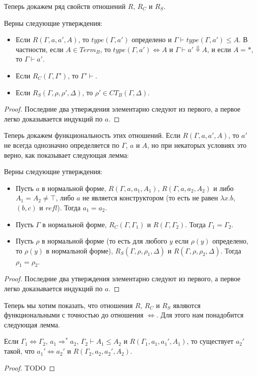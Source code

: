 \documentclass{amsart}
\theoremstyle{definition}
\theoremstyle{remark}
\newcommand{\red}{\Rightarrow}
\newcommand{\deq}{\Leftrightarrow}
\numberwithin{figure}{section}
\begin{document}
Теперь докажем ряд свойств отношений $R$, $R_C$ и $R_S$.
\begin{lem}
Верны следующие утверждения:
\begin{itemize}
\item Если $R(\Gamma, a, a', A)$, то $type(\Gamma, a')$ определено и $\Gamma \vdash type(\Gamma, a') \leq A$.
    В частности, если $A \in Term_B$, то $type(\Gamma, a') \deq A$ и $\Gamma \vdash a' \Downarrow A$,
    и если $A = *$, то $\Gamma \vdash a'$.
\item Если $R_C(\Gamma, \Gamma')$, то $\Gamma' \vdash$.
\item Если $R_S(\Gamma, \rho, \rho', \Delta)$, то $\rho' \in CT_B(\Gamma, \Delta)$.
\end{itemize}
\end{lem}
\begin{proof}
Последние два утверждения элементарно следуют из первого, а первое легко доказывается индукций по $a$.
\end{proof}

Теперь докажем функциональность этих отношений.
Если $R(\Gamma, a, a', A)$, то $a'$ не всегда однозначно определяется по $\Gamma$, $a$ и $A$, но при некаторых условиях это верно, как показывает следующая лемма:
\begin{lem}
Верны следующие утверждения:
\begin{itemize}
\item Пусть $a$ в нормальной форме, $R(\Gamma, a, a_1, A_1)$, $R(\Gamma, a, a_2, A_2)$ и либо $A_1 = A_2 \neq \top$, либо $a$ не является конструктором (то есть не равен $\lambda x. b$, $(b, c)$ и $refl$). Тогда $a_1 = a_2$.
\item Пусть $\Gamma$ в нормальной форме, $R_C(\Gamma, \Gamma_1)$ и $R(\Gamma, \Gamma_2)$. Тогда $\Gamma_1 = \Gamma_2$.
\item Пусть $\rho$ в нормальной форме (то есть для любого $y$ если $\rho(y)$ определено, то $\rho(y)$ в нормальной форме), $R_S(\Gamma, \rho, \rho_1, \Delta)$ и $R(\Gamma, \rho, \rho_2, \Delta)$. Тогда $\rho_1 = \rho_2$.
\end{itemize}
\end{lem}
\begin{proof}
Последние два утверждения элементарно следуют из первого, а первое легко доказывается индукций по $a$.
\end{proof}

Теперь мы хотим показать, что отношения $R$, $R_C$ и $R_S$ являются функциональными с точностью до отношения $\deq$.
Для этого нам понадобится следующая лемма.
\begin{lem}
Если $\Gamma_1 \deq \Gamma_2$, $a_1 \red^* a_2$, $\Gamma_2 \vdash A_1 \leq A_2$ и $R(\Gamma_1, a_1, a_1', A_1)$, то существует $a_2'$ такой, что $a_1' \deq a_2'$ и $R(\Gamma_2, a_2, a_2', A_2)$.
\end{lem}
\begin{proof}
TODO
\end{proof}
\end{document}
